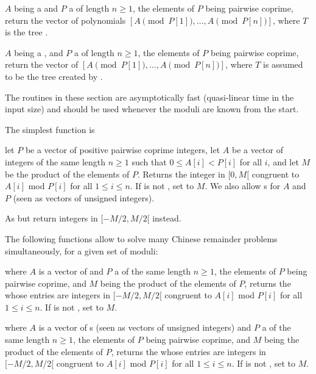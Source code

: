  $A$ being a 
and $P$ a  of length $n\ge 1$, the elements of $P$ being
pairwise coprime, return the vector of  polynomials
$[A \pmod{P[1]},\ldots,A \pmod{P[n]}]$,
where $T$ is the tree .

 $A$ being a ,
and $P$ a  of length $n\ge 1$, the elements of $P$ being
pairwise coprime, return the vector of 
$[A \pmod{P[1]},\ldots,A \pmod{P[n]}]$,
where $T$ is assumed to be the tree created by .

\medskip

The routines in these section are asymptotically fast (quasi-linear time in
the input size) and should be used whenever the moduli are known from
the start.

The simplest function is

let $P$ be a vector of positive pairwise coprime integers, let $A$ be a
vector of integers of the same length $n\ge 1$ such that $0 \leq A[i] < P[i]$
for all $i$, and let $M$ be the product of the elements of $P$. Returns the
integer in $[0, M[$ congruent to $A[i]$ mod $P[i]$ for all $1\leq i\leq n$.
If  is not , set  to $M$. We also allow
s for $A$ and $P$ (seen as vectors of unsigned integers).

As  but return integers in $[-M/2, M/2[$ instead.

The following functions allow to solve many Chinese remainder problems
simultaneously, for a given set of moduli:

where $A$ is a vector of 
and $P$ a  of the same length $n\ge 1$, the elements of $P$
being pairwise coprime, and $M$ being the product of the elements of $P$,
returns the  whose entries are integers in $[-M/2, M/2[$ congruent to $A[i]$
mod $P[i]$ for all $1\leq i\leq n$.
If  is not , set  to $M$.

 where $A$ is a
vector of s (seen as vectors of unsigned integers) and $P$ a
 of the same length $n\ge 1$, the elements of $P$ being
pairwise coprime, and $M$ being the product of the elements of $P$, returns
the  whose entries are integers in $[-M/2, M/2[$ congruent to $A[i]$
mod $P[i]$ for all $1\leq i\leq n$. If  is not , set
 to $M$.

